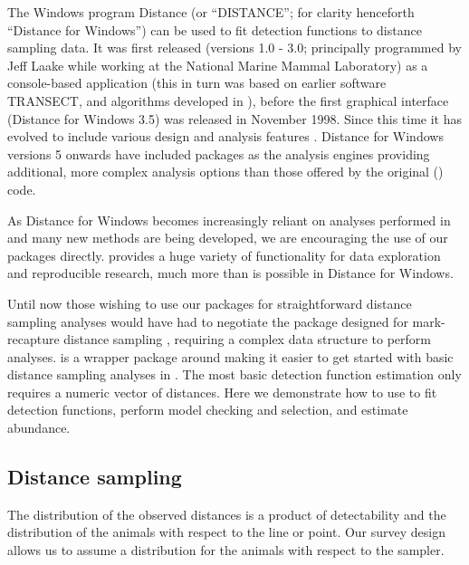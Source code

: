 \documentclass[article]{jss}\usepackage[]{graphicx}\usepackage[]{color}
\begin{document}
The Windows program Distance (or ``DISTANCE''; for clarity henceforth ``Distance for Windows'') can be used to fit detection functions to distance sampling data. It was first released (versions 1.0 - 3.0; principally programmed by Jeff Laake while working at the National Marine Mammal Laboratory) as a console-based application (this in turn was based on earlier software TRANSECT, \citealp{Burnham:1980wz} and algorithms developed in \citealp{Buckland:1992fa}), before the first graphical interface (Distance for Windows 3.5) was released in November 1998. Since this time it has evolved to include various design and analysis features \citep{Thomas:2010cf}. Distance for Windows versions 5 onwards have included  \citep{rcore} packages as the analysis engines providing additional, more complex analysis options than those offered by the original () code.

As Distance for Windows becomes increasingly reliant on analyses performed in  and many new methods are being developed, we are encouraging the use of our  packages directly.  provides a huge variety of functionality for data exploration and reproducible research, much more than is possible in Distance for Windows.

Until now those wishing to use our  packages for straightforward distance sampling analyses would have had to negotiate the package  \citep{mrds-pkg} designed for mark-recapture distance sampling \citep{Burt:2014gu}, requiring a complex data structure to perform analyses.  is a wrapper package around  making it easier to get started with basic distance sampling analyses in . The most basic detection function estimation only requires a numeric vector of distances. Here we demonstrate how to use  to fit detection functions, perform model checking and selection, and estimate abundance.


\subsection{Distance sampling}

The distribution of the observed distances is a product of detectability \citep[sometimes referred to as ``perception bias'';][]{Marsh:1989ho} and the distribution of the animals with respect to the line or point. Our survey design allows us to assume a distribution for the animals with respect to the sampler.
\end{document}
